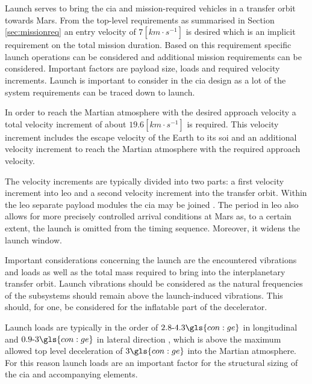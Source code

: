 Launch serves to bring the \gls{cia} and mission-required vehicles in a transfer orbit towards Mars. From the top-level requirements as summarised in Section \ref{sec:missionreq} an entry velocity of $7 \left[km\cdot s^{-1}\right]$ is desired which is an implicit requirement on the total mission duration.
Based on this requirement specific launch operations can be considered and additional mission requirements can be considered. Important factors are payload size, loads and required velocity increments. Launch is important to consider in the \gls{cia} design as a lot of the system requirements can be traced down to launch.

In order to reach the Martian atmosphere with the desired approach velocity a total velocity increment of about $19.6 \left[km\cdot s^{-1}\right]$ is required. This velocity increment includes the escape velocity of the Earth to its \gls{soi} and an additional velocity increment to reach the Martian atmosphere with the required approach velocity.

The velocity increments are typically divided into two parts: a first velocity increment into \gls{leo} and a second velocity increment into the transfer orbit. Within the \gls{leo} separate payload modules the \gls{cia} may be joined \cite{George2009}. The period in \gls{leo} also allows for more precisely controlled arrival conditions at Mars as, to a certain extent, the launch is omitted from the timing sequence. Moreover, it widens the launch window.


Important considerations concerning the launch are the encountered vibrations and loads as well as the total mass required to bring into the interplanetary transfer orbit. Launch vibrations should be considered as the natural frequencies of the subsystems should remain above the launch-induced vibrations. This should, for one, be considered for the inflatable part of the decelerator.

Launch loads are typically in the order of $2.8\mbox{-}4.3 \gls{con:ge}$ in longitudinal and $0.9\mbox{-}3 \gls{con:ge}$ in lateral direction \cite{Wertz2011}, which is above the maximum allowed top level deceleration of $3\gls{con:ge}$ into the Martian atmosphere. For this reason launch loads are an important factor for the structural sizing of the \gls{cia} and accompanying elements. 

